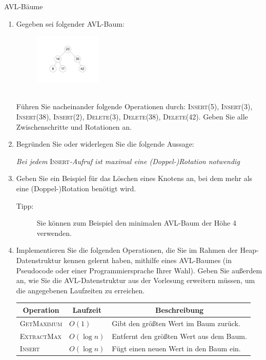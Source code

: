 \documentclass[11pt,a4paper]{article}
\begin{document}
\begin{aufgabe}{3}{AVL-Bäume}
    \begin{enumerate}
        \item Gegeben sei folgender AVL-Baum:
        \begin{figure}[h!]
            \centering
            \includegraphics[width=0.3\textwidth]{img/3a}
        \end{figure}
        \FloatBarrier
        \ \\
        Führen Sie nacheinander folgende Operationen durch: \textsc{Insert(5), Insert(3), Insert(38), Insert(2), Delete(3), Delete(38), Delete(42)}.
        Geben Sie alle Zwischenschritte und Rotationen an.
        \item Begründen Sie oder widerlegen Sie die folgende Aussage:
        \begin{center}
            \emph{Bei jedem }\textsc{Insert}\emph{-Aufruf ist maximal eine (Doppel-)Rotation notwendig}
        \end{center}
        \item Geben Sie ein Beispiel für das Löschen eines Knotens an, bei dem mehr als eine (Doppel-)Rotation benötigt wird.
        \begin{description}
            \item[Tipp:] Sie können zum Beispiel den minimalen AVL-Baum der Höhe 4 verwenden.
        \end{description}
        \item Implementieren Sie die folgenden Operationen, die Sie im Rahmen der Heap-Datenstruktur kennen gelernt haben, mithilfe eines AVL-Baumes (in Pseudocode oder einer Programmiersprache Ihrer Wahl).
        Geben Sie außerdem an, wie Sie die AVL-Datenstruktur aus der Vorlesung erweitern müssen, um die angegebenen Laufzeiten zu erreichen.
        \begin{table}[h!]
            \centering
            \begin{tabular}{|l|l|l|}
            \hline
            \multicolumn{1}{|c|}{\textbf{Operation}}  & \multicolumn{1}{c|}{\textbf{Laufzeit}} & \multicolumn{1}{c|}{\textbf{Beschreibung}}\\ \hline
            \textsc{GetMaximum} & $O(1)$      & Gibt den größten Wert im Baum zurück.\\ \hline
            \textsc{ExtractMax} & $O(\log n)$ & Entfernt den größten Wert aus dem Baum. \\ \hline
            \textsc{Insert}     & $O(\log n)$ & Fügt einen neuen Wert in den Baum ein. \\ \hline
            \end{tabular}
        \end{table}
    \end{enumerate}
\end{aufgabe}
\end{document}
